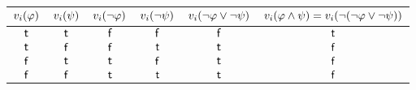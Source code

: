 \begin{myCorollary}
  \begin{table}
    \begin{tabular}{|c|c|c|c|c|c|}\hline
      $v_i(\varphi)$ & $v_i(\psi)$ & $v_i(\lnot\varphi)$ & $v_i(\lnot\psi)$ & $v_i(\lnot \varphi \lor \lnot\psi)$ & $v_i(\varphi \land \psi) = v_i(\lnot(\lnot\varphi \lor \lnot\psi))$ \\ \hline
      $\mathsf{t}$                                  & $\mathsf{t}$                               & $\mathsf{f}$                                      & $\mathsf{f}$                                   & $\mathsf{f}$                                                      & $\mathsf{t}$                                                                                                                 \\ \hline
      $\mathsf{t}$                                  & $\mathsf{f}$                              & $\mathsf{f}$                                      & $\mathsf{t}$                                    & $\mathsf{t}$                                                       & $\mathsf{f}$                                                                                                                \\ \hline
      $\mathsf{f}$                                 & $\mathsf{t}$                               & $\mathsf{t}$                                       & $\mathsf{f}$                                   & $\mathsf{t}$                                                       & $\mathsf{f}$                                                                                                                \\ \hline
      $\mathsf{f}$                                 & $\mathsf{f}$                              & $\mathsf{t}$                                       & $\mathsf{t}$                                    & $\mathsf{t}$                                                       & $\mathsf{f}$                                                                                                                \\ \hline
    \end{tabular}
  \end{table}


\end{myCorollary}
